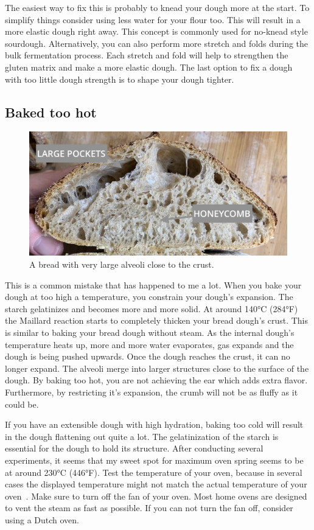 The easiest way to fix this is probably to knead your dough more at the start. To simplify
things consider using less water for your flour too. This will result in a more elastic dough
right away. This concept is commonly used for no-knead style sourdough.  Alternatively, you
can also perform more stretch and folds during the bulk fermentation process. Each
stretch and fold will help to strengthen the gluten matrix and make a more elastic dough.
The last option to fix a dough with too little dough strength is to shape your dough tighter.

\subsection{Baked too hot}

\begin{figure}
  \includegraphics[width=\textwidth]{baked-too-hot-v2}
  \caption{A bread with very large alveoli close to the crust.}%
  \label{baked-too-hot}
\end{figure}

This is a common mistake that has happened to me a lot. When you bake your dough
at too high a temperature, you constrain your dough's expansion. The starch gelatinizes
and becomes more and more solid. At around 140°C (284°F) the Maillard reaction
starts to completely thicken your bread dough's crust. This is similar to baking
your bread dough without steam. As the internal dough's temperature heats up,
more and more water evaporates, gas expands and the dough is being pushed upwards.
Once the dough reaches the crust, it can no longer expand. The alveoli merge
into larger structures close to the surface of the dough. By baking too hot,
you are not achieving the ear which adds extra flavor. Furthermore, by restricting
it's expansion, the crumb will not be as fluffy as it could be.

If you have an extensible dough with high hydration, baking too cold will result
in the dough flattening out quite a lot. The gelatinization of the starch is
essential for the dough to hold its structure. After conducting several
experiments, it seems that my sweet spot for maximum oven spring seems to be
at around 230°C (446°F). Test the temperature of your oven, because in several
cases the displayed temperature might not match the actual temperature of your
oven~\cite{too+hot+baking}. Make sure to turn off the fan of your oven. Most
home ovens are designed to vent the steam as fast as possible. If you can not
turn the fan off, consider using a Dutch oven.

